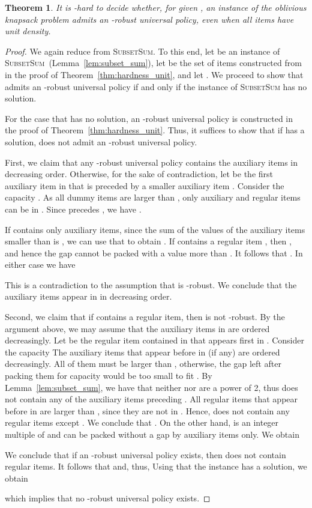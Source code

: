 \documentclass[11pt]{article}
\newtheorem{theorem}{Theorem}
\begin{document}
\pagebreak 
\begin{theorem}
It is -hard to decide whether, for given ,
an instance of the oblivious knapsack problem admits an -robust
universal policy, even when all items have unit density.\end{theorem}
\begin{proof}
We again reduce from \textsc{SubsetSum}. To this end, let 
be an instance of \textsc{SubsetSum}~(Lemma~\ref{lem:subset_sum}),
let  be the set of items constructed from  in the proof
of Theorem~\ref{thm:hardness_unit}, and let .
We proceed to show that  admits an -robust universal
policy if and only if the instance \textsc{ }of \textsc{SubsetSum}
has no solution.

For the case that  has no solution, an -robust universal
policy is constructed in the proof of Theorem~\ref{thm:hardness_unit}.
Thus, it suffices to show that if  has a solution,  does
not admit an -robust universal policy.

First, we claim that any -robust universal policy 
contains the auxiliary items in decreasing order. Otherwise, for the
sake of contradiction, let  be the first auxiliary item in 
that is preceded by a smaller auxiliary item . Consider the capacity
. As all dummy items are larger than , only auxiliary
and regular items can be in . Since  precedes , we
have . 

If\emph{ } contains only auxiliary items, since the sum of
the values of the auxiliary items smaller than  is ,
we can use that  to obtain .
If \emph{} contains a regular item , then ,
and hence the gap  cannot be packed with a value more than
. It follows that .
In either case we have

This is a contradiction to the assumption that  is -robust.
We conclude that the auxiliary items appear in  in decreasing
order.

Second, we claim that if  contains a regular item, then 
is not -robust. By the argument above, we may assume that
the auxiliary items in  are ordered decreasingly. Let  be
the regular item contained in  that appears first in .
Consider the capacity  The auxiliary items
that appear before  in  (if any) are ordered decreasingly.
All of them must be larger than , otherwise, the gap left after
packing them for capacity  would be too small to fit . By
Lemma~\ref{lem:subset_sum}, we have that neither  nor 
are a power of 2, thus  does not contain any of the auxiliary
items preceding . All regular items that appear before  in
 are larger than , since they are not in . Hence,
 does not contain any regular items except . We conclude
that . On the other hand,  is an integer multiple
of  and can be packed without a gap by auxiliary items
only. We obtain

We conclude that if an -robust universal policy  exists,
then  does not contain regular items. It follows that 
and, thus,  Using that the 
instance  has a solution, we obtain


which implies that no -robust universal policy exists.
\end{proof}


\end{document}

